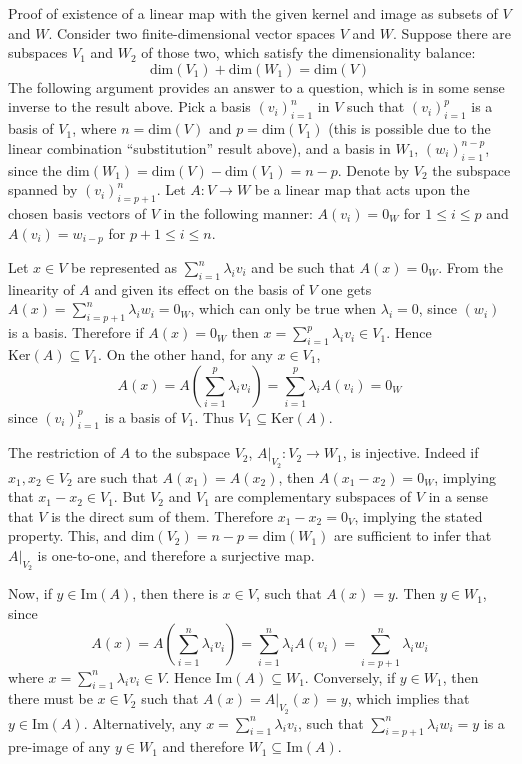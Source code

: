 \documentclass[a4paper]{article}
\newcommand{\brac}[1]{\ensuremath{\left( #1 \right)}}
\newcommand{\Dim}[1]{\ensuremath{\text{dim}\brac{ #1 }}}
\newcommand{\Ker}[1]{\ensuremath{\text{Ker}\brac{ #1 }}}
\newcommand{\im}[1]{\ensuremath{\text{Im}\brac{ #1 }}}
\begin{document}
Proof of existence of a linear map with the given kernel and image as subsets of $V$ and $W$. Consider two finite-dimensional vector spaces $V$ and $W$. Suppose there are subspaces $V_1$ and $W_2$ of those two, which satisfy the dimensionality balance:\[\Dim{V_1}+\Dim{W_1} = \Dim{V}\]The following argument provides an answer to a question, which is in some sense inverse to the result above.
Pick a basis $\brac{v_i}_{i=1}^n$ in $V$ such that $\brac{v_i}_{i=1}^p$ is a basis of $V_1$, where $n = \Dim{V}$ and $p = \Dim{V_1}$ (this is possible due to the linear combination ``substitution'' result above), and a basis in $W_1$, $\brac{w_i}_{i=1}^{n-p}$, since the $\Dim{W_1} = \Dim{V}-\Dim{V_1} = n-p$. Denote by $V_2$ the subspace spanned by $\brac{v_i}_{i=p+1}^n$. Let $A:V\to W$ be a linear map that acts upon the chosen basis vectors of $V$ in the following manner: $A\brac{v_i} = 0_W$ for $1\leq i \leq p$ and $A\brac{v_i} = w_{i-p}$ for $p+1\leq i \leq n$.

Let $x \in V$ be represented as $\sum_{i=1}^n \lambda_i v_i$ and be such that $A\brac{x} = 0_W$. From the linearity of $A$ and given its effect on the basis of $V$ one gets $A\brac{x} = \sum_{i=p+1}^n \lambda_i w_i = 0_W$, which can only be true when $\lambda_i = 0$, since $\brac{w_i}$ is a basis. Therefore if $A\brac{x} = 0_W$ then $x = \sum_{i=1}^p \lambda_i v_i \in V_1$. Hence $\Ker{A} \subseteq V_1$. On the other hand, for any $x\in V_1$, \[A\brac{x} = A\brac{\sum_{i=1}^p \lambda_i v_i} = \sum_{i=1}^p \lambda_i A\brac{v_i} = 0_W\] since $\brac{v_i}_{i=1}^p$ is a basis of $V_1$. Thus $V_1 \subseteq \Ker{A}$.

The restriction of $A$ to the subspace $V_2$, $A\vert_{V_2}:V_2 \to W_1$, is injective. Indeed if $x_1, x_2\in V_2$ are such that $A\brac{x_1}=A\brac{x_2}$, then $A\brac{x_1-x_2}=0_W$, implying that $x_1-x_2\in V_1$. But $V_2$ and $V_1$ are complementary subspaces of $V$ in a sense that $V$ is the direct sum of them. Therefore $x_1-x_2=0_V$, implying the stated property. This, and $\Dim{V_2} = n-p = \Dim{W_1}$ are sufficient to infer that $A\vert_{V_2}$ is one-to-one, and therefore a surjective map.

Now, if $y\in \im{A}$, then there is $x\in V$, such that $A\brac{x}=y$. Then $y\in W_1$, since \[A\brac{x} = A\brac{\sum_{i=1}^n \lambda_i v_i} = \sum_{i=1}^n \lambda_i A\brac{v_i} = \sum_{i=p+1}^n \lambda_i w_i\] where $x = \sum_{i=1}^n \lambda_i v_i\in V$. Hence $\im{A}\subseteq W_1$. Conversely, if $y\in W_1$, then there must be $x\in V_2$ such that $A\brac{x} = A\vert_{V_2}\brac{x} = y$, which implies that $y\in \im{A}$. Alternatively, any $x=\sum_{i=1}^n \lambda_i v_i$, such that $\sum_{i=p+1}^n \lambda_i w_i = y$ is a pre-image of any $y\in W_1$ and therefore $W_1\subseteq \im{A}$.
\end{document}
